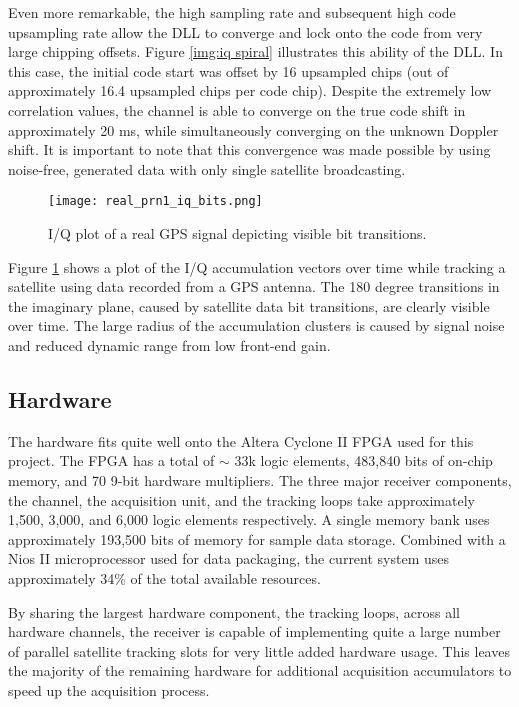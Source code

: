 \documentclass[12pt]{article}
\begin{document}
Even more remarkable, the high sampling rate and subsequent high code upsampling rate allow the DLL to converge and lock onto the code from very large chipping offsets. Figure \ref{img:iq spiral} illustrates this ability of the DLL. In this case, the initial code start was offset by 16 upsampled chips (out of approximately 16.4 upsampled chips per code chip). Despite the extremely low correlation values, the channel is able to converge on the true code shift in approximately 20 ms, while simultaneously converging on the unknown Doppler shift. It is important to note that this convergence was made possible by using noise-free, generated data with only single satellite broadcasting.

\begin{figure}
\centering
\texttt{[image: real\_prn1\_iq\_bits.png]}
\caption{I/Q plot of a real GPS signal depicting visible bit transitions.}
\label{img:iq bits}
\end{figure}

Figure \ref{img:iq bits} shows a plot of the I/Q accumulation vectors over time while tracking a satellite using data recorded from a GPS antenna. The 180 degree transitions in the imaginary plane, caused by satellite data bit transitions, are clearly visible over time. The large radius of the accumulation clusters is caused by signal noise and reduced dynamic range from low front-end gain.

\subsection{Hardware}
The hardware fits quite well onto the Altera Cyclone II FPGA used for this project. The FPGA has a total of $\sim$ 33k logic elements, 483,840 bits of on-chip memory, and 70 9-bit hardware multipliers. The three major receiver components, the channel, the acquisition unit, and the tracking loops take approximately 1,500, 3,000, and 6,000 logic elements respectively. A single memory bank uses approximately 193,500 bits of memory for sample data storage. Combined with a Nios II microprocessor used for data packaging, the current system uses approximately 34\% of the total available resources.

By sharing the largest hardware component, the tracking loops, across all hardware channels, the receiver is capable of implementing quite a large number of parallel satellite tracking slots for very little added hardware usage. This leaves the majority of the remaining hardware for additional acquisition accumulators to speed up the acquisition process.
\end{document}
